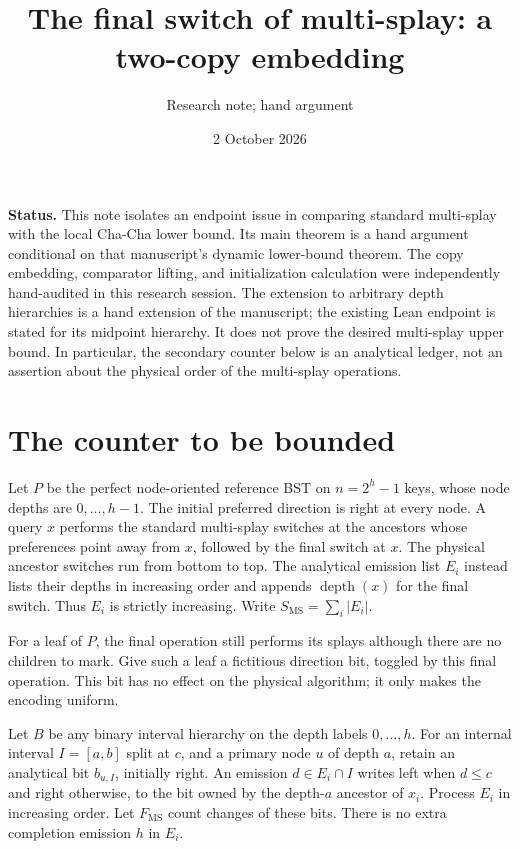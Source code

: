 \documentclass[11pt]{article}
\title{The final switch of multi-splay: a two-copy embedding}
\author{Research note; hand argument}
\date{2 October 2026}
\newcommand{\MS}{\mathrm{MS}}
\newcommand{\dep}{\operatorname{depth}}
\begin{document}
\maketitle

\noindent\textbf{Status.}
This note isolates an endpoint issue in comparing standard multi-splay
with the local Cha-Cha lower bound. Its main theorem is a hand
argument conditional on that manuscript's dynamic lower-bound theorem.
The copy embedding, comparator lifting, and initialization calculation
were independently hand-audited in this research session. The extension
to arbitrary depth hierarchies is a hand extension of the manuscript;
the existing Lean endpoint is stated for its midpoint hierarchy.
It does not prove the desired multi-splay upper bound. In particular,
the secondary counter below is an analytical ledger, not an assertion
about the physical order of the multi-splay operations.

\section{The counter to be bounded}

Let $P$ be the perfect node-oriented reference BST on
$n=2^h-1$ keys, whose node depths are $0,\ldots,h-1$.
The initial preferred direction is right at every node. A query $x$
performs the standard multi-splay switches at the ancestors whose
preferences point away from $x$, followed by the final switch at $x$.
The physical ancestor switches run from bottom to top. The analytical
emission list $E_i$ instead lists their depths in increasing order and
appends $\dep(x)$ for the final switch. Thus $E_i$ is strictly increasing.
Write $S_{\MS}=\sum_i|E_i|$.

For a leaf of $P$, the final operation still performs its splays although
there are no children to mark. Give such a leaf a fictitious direction
bit, toggled by this final operation. This bit has no effect on the
physical algorithm; it only makes the encoding uniform.

Let $B$ be any binary interval hierarchy on the depth labels
$0,\ldots,h$. For an internal interval $I=[a,b]$ split at $c$, and a
primary node $u$ of depth $a$, retain an analytical bit $b_{u,I}$,
initially right. An emission $d\in E_i\cap I$ writes left when $d\le c$
and right otherwise, to the bit owned by the depth-$a$ ancestor of
$x_i$. Process $E_i$ in increasing order. Let $F_{\MS}$ count changes of
these bits. There is no extra completion emission $h$ in $E_i$.
\end{document}
